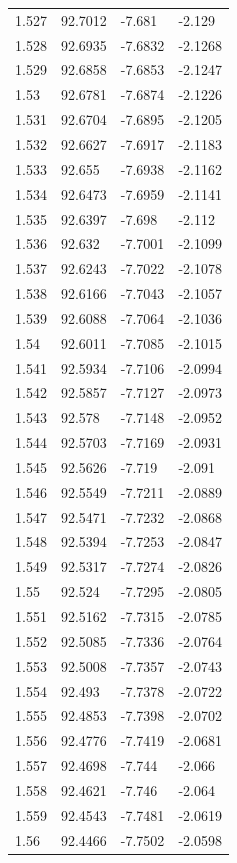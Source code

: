 \begin{tabular}{llll}
1.527 & 92.7012 & -7.681 & -2.129 \\
1.528 & 92.6935 & -7.6832 & -2.1268 \\
1.529 & 92.6858 & -7.6853 & -2.1247 \\
1.53 & 92.6781 & -7.6874 & -2.1226 \\
1.531 & 92.6704 & -7.6895 & -2.1205 \\
1.532 & 92.6627 & -7.6917 & -2.1183 \\
1.533 & 92.655 & -7.6938 & -2.1162 \\
1.534 & 92.6473 & -7.6959 & -2.1141 \\
1.535 & 92.6397 & -7.698 & -2.112 \\
1.536 & 92.632 & -7.7001 & -2.1099 \\
1.537 & 92.6243 & -7.7022 & -2.1078 \\
1.538 & 92.6166 & -7.7043 & -2.1057 \\
1.539 & 92.6088 & -7.7064 & -2.1036 \\
1.54 & 92.6011 & -7.7085 & -2.1015 \\
1.541 & 92.5934 & -7.7106 & -2.0994 \\
1.542 & 92.5857 & -7.7127 & -2.0973 \\
1.543 & 92.578 & -7.7148 & -2.0952 \\
1.544 & 92.5703 & -7.7169 & -2.0931 \\
1.545 & 92.5626 & -7.719 & -2.091 \\
1.546 & 92.5549 & -7.7211 & -2.0889 \\
1.547 & 92.5471 & -7.7232 & -2.0868 \\
1.548 & 92.5394 & -7.7253 & -2.0847 \\
1.549 & 92.5317 & -7.7274 & -2.0826 \\
1.55 & 92.524 & -7.7295 & -2.0805 \\
1.551 & 92.5162 & -7.7315 & -2.0785 \\
1.552 & 92.5085 & -7.7336 & -2.0764 \\
1.553 & 92.5008 & -7.7357 & -2.0743 \\
1.554 & 92.493 & -7.7378 & -2.0722 \\
1.555 & 92.4853 & -7.7398 & -2.0702 \\
1.556 & 92.4776 & -7.7419 & -2.0681 \\
1.557 & 92.4698 & -7.744 & -2.066 \\
1.558 & 92.4621 & -7.746 & -2.064 \\
1.559 & 92.4543 & -7.7481 & -2.0619 \\
1.56 & 92.4466 & -7.7502 & -2.0598 \\

\end{tabular}
